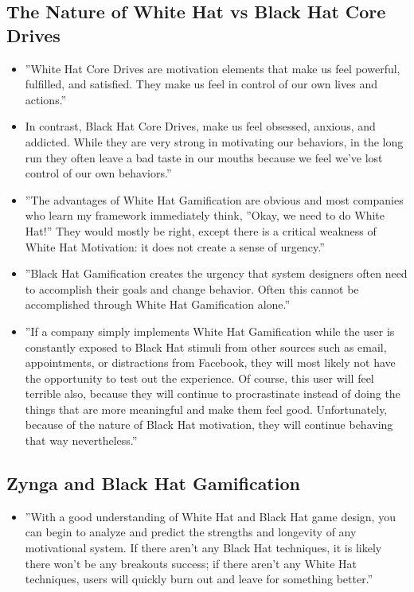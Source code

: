 \subsection{The Nature of White Hat vs Black Hat Core Drives}
\begin{itemize}
    \item ''White Hat Core Drives are motivation elements that make us feel powerful, fulfilled, and satisfied. They make us feel in control of our own lives and actions.''
    \item In contrast, Black Hat Core Drives, make us feel obsessed, anxious, and addicted. While they are very strong in motivating our behaviors, in the long run they often leave a bad taste in our mouths because we feel we've lost control of our own behaviors.''
    \item ''The advantages of White Hat Gamification are obvious and most companies who learn my framework immediately think, ''Okay, we need to do White Hat!'' They would mostly be right, except there is a critical weakness of White Hat Motivation: it does not create a sense of urgency.''
    \item ''Black Hat Gamification creates the urgency that system designers often need to accomplish their goals and change behavior. Often this cannot be accomplished through White Hat Gamification alone.''
    \item ''If a company simply implements White Hat Gamification while the user is constantly exposed to Black Hat stimuli from other sources such as email, appointments, or distractions from Facebook, they will most likely not have the opportunity to test out the experience. Of course, this user will feel terrible also, because they will continue to procrastinate instead of doing the things that are more meaningful and make them feel good. Unfortunately, because of the nature of Black Hat motivation, they will continue behaving that way nevertheless.''
\end{itemize}

\subsection{Zynga and Black Hat Gamification}
\begin{itemize}
    \item ''With a good understanding of White Hat and Black Hat game design, you can begin to analyze and predict the strengths and longevity of any motivational system. If there aren't any Black Hat techniques, it is likely there won't be any breakouts success; if there aren't any White Hat techniques, users will quickly burn out and leave for something better.''
\end{itemize}

